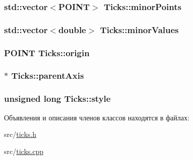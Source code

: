 \hypertarget{class_ticks_aad15b47014c3660f4e9299be607ef78c}{
\subsubsection[{minor\-Points}]{\setlength{\rightskip}{0pt plus 5cm}std\-::vector$<$P\-O\-I\-N\-T$>$ Ticks\-::minor\-Points\hspace{0.3cm}{\ttfamily [protected]}}}\label{class_ticks_aad15b47014c3660f4e9299be607ef78c}
\hypertarget{class_ticks_a2cc0e38cace3edc53a31e329781ba2de}{
\subsubsection[{minor\-Values}]{\setlength{\rightskip}{0pt plus 5cm}std\-::vector$<$double$>$ Ticks\-::minor\-Values\hspace{0.3cm}{\ttfamily [protected]}}}\label{class_ticks_a2cc0e38cace3edc53a31e329781ba2de}
\hypertarget{class_ticks_a316c176b6108e99b7327efa4e62c9276}{
\subsubsection[{origin}]{\setlength{\rightskip}{0pt plus 5cm}P\-O\-I\-N\-T Ticks\-::origin\hspace{0.3cm}{\ttfamily [protected]}}}\label{class_ticks_a316c176b6108e99b7327efa4e62c9276}
\hypertarget{class_ticks_a1651670c18ed9ab64dc36f1a0f97f6c6}{
\subsubsection[{parent\-Axis}]{$\ast$ Ticks\-::parent\-Axis\hspace{0.3cm}{\ttfamily [protected]}}}\label{class_ticks_a1651670c18ed9ab64dc36f1a0f97f6c6}
\hypertarget{class_ticks_a26f1426254b2dbb52faf65e367c842d7}{
\subsubsection[{style}]{\setlength{\rightskip}{0pt plus 5cm}unsigned long Ticks\-::style\hspace{0.3cm}{\ttfamily [protected]}}}\label{class_ticks_a26f1426254b2dbb52faf65e367c842d7}


Объявления и описания членов классов находятся в файлах\-:\begin{DoxyCompactItemize}
\item 
src/\hyperlink{ticks_8h}{ticks.\-h}\item 
src/\hyperlink{ticks_8cpp}{ticks.\-cpp}\end{DoxyCompactItemize}
